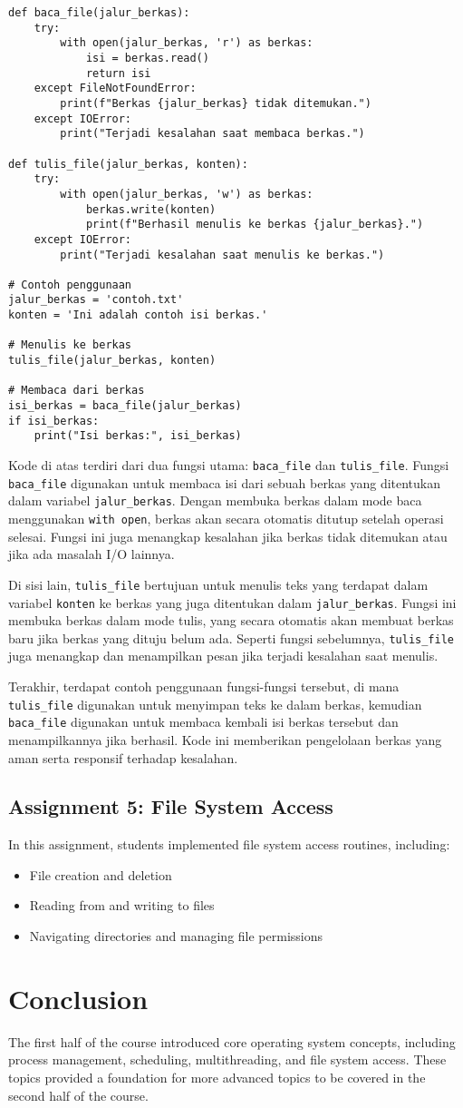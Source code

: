 \documentclass[12pt]{article}
\begin{document}
\begin{verbatim}
def baca_file(jalur_berkas):
    try:
        with open(jalur_berkas, 'r') as berkas:
            isi = berkas.read()
            return isi
    except FileNotFoundError:
        print(f"Berkas {jalur_berkas} tidak ditemukan.")
    except IOError:
        print("Terjadi kesalahan saat membaca berkas.")

def tulis_file(jalur_berkas, konten):
    try:
        with open(jalur_berkas, 'w') as berkas:
            berkas.write(konten)
            print(f"Berhasil menulis ke berkas {jalur_berkas}.")
    except IOError:
        print("Terjadi kesalahan saat menulis ke berkas.")

# Contoh penggunaan
jalur_berkas = 'contoh.txt'
konten = 'Ini adalah contoh isi berkas.'

# Menulis ke berkas
tulis_file(jalur_berkas, konten)

# Membaca dari berkas
isi_berkas = baca_file(jalur_berkas)
if isi_berkas:
    print("Isi berkas:", isi_berkas)
\end{verbatim}

Kode di atas terdiri dari dua fungsi utama: \texttt{baca\_file} dan \texttt{tulis\_file}. Fungsi \texttt{baca\_file} digunakan untuk membaca isi dari sebuah berkas yang ditentukan dalam variabel \texttt{jalur\_berkas}. Dengan membuka berkas dalam mode baca menggunakan \texttt{with open}, berkas akan secara otomatis ditutup setelah operasi selesai. Fungsi ini juga menangkap kesalahan jika berkas tidak ditemukan atau jika ada masalah I/O lainnya.

Di sisi lain, \texttt{tulis\_file} bertujuan untuk menulis teks yang terdapat dalam variabel \texttt{konten} ke berkas yang juga ditentukan dalam \texttt{jalur\_berkas}. Fungsi ini membuka berkas dalam mode tulis, yang secara otomatis akan membuat berkas baru jika berkas yang dituju belum ada. Seperti fungsi sebelumnya, \texttt{tulis\_file} juga menangkap dan menampilkan pesan jika terjadi kesalahan saat menulis.

Terakhir, terdapat contoh penggunaan fungsi-fungsi tersebut, di mana \texttt{tulis\_file} digunakan untuk menyimpan teks ke dalam berkas, kemudian \texttt{baca\_file} digunakan untuk membaca kembali isi berkas tersebut dan menampilkannya jika berhasil. Kode ini memberikan pengelolaan berkas yang aman serta responsif terhadap kesalahan.


\subsection{Assignment 5: File System Access}
In this assignment, students implemented file system access routines, including:
\begin{itemize}
    \item File creation and deletion
    \item Reading from and writing to files
    \item Navigating directories and managing file permissions
\end{itemize}

\section{Conclusion}
The first half of the course introduced core operating system concepts, including process management, scheduling, multithreading, and file system access. These topics provided a foundation for more advanced topics to be covered in the second half of the course.
\end{document}
